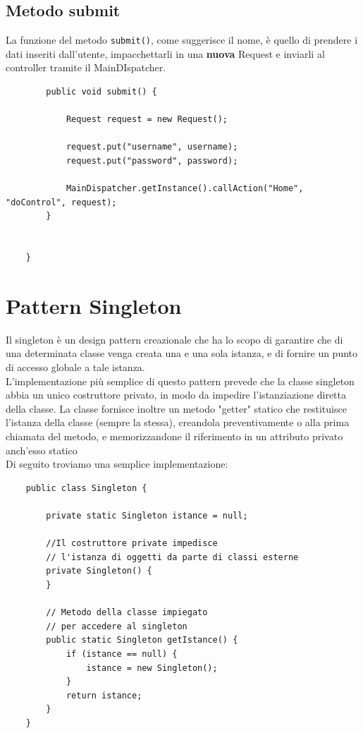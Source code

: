 \documentclass[a4paper,12 pt]{article}
\begin{document}
		\subsection{Metodo submit}
		La funzione del metodo \texttt{submit()}, come suggerisce il nome, è quello di prendere i dati inseriti dall'utente, impacchettarli in una \textbf{nuova} Request e inviarli al controller
		tramite il MainDIspatcher.
		\begin{lstlisting}
		public void submit() {
			
			Request request = new Request();
			
			request.put("username", username);
			request.put("password", password);
			
			MainDispatcher.getInstance().callAction("Home", "doControl", request);
		}
	
	
	}
	\end{lstlisting}
	
	\section{Pattern Singleton}
	Il singleton è un design pattern creazionale che ha lo scopo di garantire che di una determinata classe venga creata una e una sola istanza, e di fornire un punto di accesso globale a tale istanza.\\
	
	L'implementazione più semplice di questo pattern prevede che la classe singleton abbia un unico costruttore privato, in modo da impedire l'istanziazione diretta della classe. La classe fornisce inoltre un metodo "getter" statico che restituisce l'istanza della classe (sempre la stessa), creandola preventivamente o alla prima chiamata del metodo, e memorizzandone il riferimento in un attributo privato anch'esso statico \\
	
	Di seguito troviamo una semplice implementazione:
	\begin{lstlisting}
	public class Singleton {
		
		private static Singleton istance = null;
			
		//Il costruttore private impedisce
		// l'istanza di oggetti da parte di classi esterne
		private Singleton() {
		}
		
		// Metodo della classe impiegato
		// per accedere al singleton
		public static Singleton getIstance() {
			if (istance == null) {
				istance = new Singleton();
			}
			return istance;
		}
	}
	\end{lstlisting}
	
\end{document}

